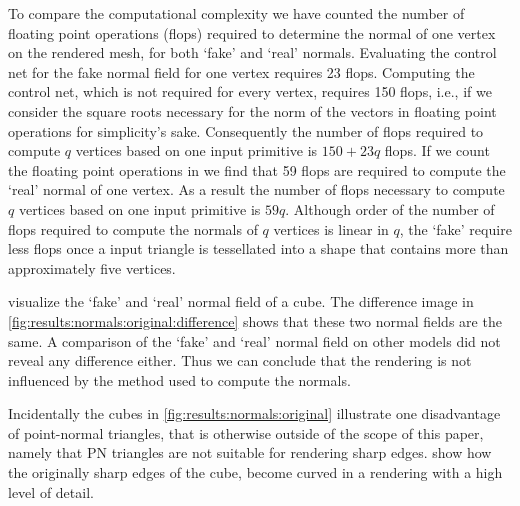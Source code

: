 To compare the computational complexity we have counted the number of floating point operations (flops) required to determine the normal of one vertex on the rendered mesh, for both `fake' and `real' normals. 
Evaluating the control net for the fake normal field for one vertex requires 23 flops. Computing the control net, which is not required for every vertex, requires 150 flops, i.e., if we consider the square roots necessary for the norm of the vectors in  floating point operations for simplicity's sake. Consequently the number of flops required to compute $q$ vertices based on one input primitive is $150 + 23q$ flops.
If we count the floating point operations in  we find that 59 flops are required to compute the `real' normal of one vertex. As a result the number of flops necessary to compute $q$ vertices based on one input primitive is $59q$. 
Although order of the number of flops required to compute the normals of $q$ vertices is linear in $q$, the `fake' require less flops once a input triangle is tessellated into a shape that contains more than approximately five vertices. 

 visualize the `fake' and `real' normal field of a cube. The difference image in \cref{fig:results:normals:original:difference} shows that these two normal fields are the same. A comparison of the `fake' and `real' normal field on other models did not reveal any difference either.  Thus we can conclude that the rendering is not influenced by the method used to compute the normals. 

Incidentally the cubes in \cref{fig:results:normals:original} illustrate one disadvantage of point-normal triangles, that is otherwise outside of the scope of this paper, namely that PN triangles are not suitable for rendering sharp edges.  show how the originally sharp edges of the cube, become curved in a rendering with a high level of detail.